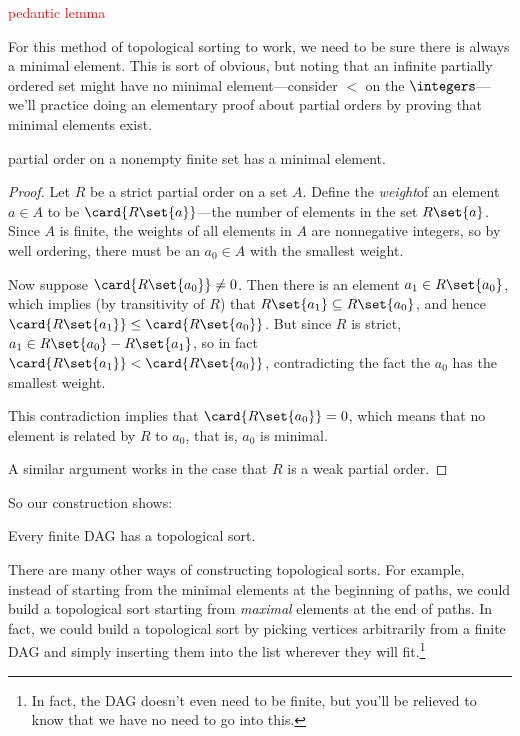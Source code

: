 \begin{editingnotes}
\textcolor{red}{pedantic lemma}

For this method of topological sorting to work, we need to be sure
there is always a minimal element.  This is sort of obvious, but
noting that an infinite partially ordered set might have no minimal
element---consider $<$ on the $\integers$---we'll practice doing an
elementary proof about partial orders by proving that minimal elements
exist.

\begin{lemma}\label{finmin}
   partial order on a nonempty finite set
  has a minimal element.

\begin{proof} Let $R$ be a strict partial order on a set $A$.  Define
 the \emph{weight}of an element $a \in A$ to be
 $\card{R\set{a}}$---the number of elements in the set $R\set{a}$.
 Since $A$ is finite, the weights of all elements in $A$ are
 nonnegative integers, so by well ordering, there must be an $a_0 \in
 A$ with the smallest weight.

Now suppose $\card{R\set{a_0}} \neq 0$.  Then there is an element $a_1 \in
R\set{a_0}$, which implies (by transitivity of $R$) that $R\set{a_1}
\subseteq R\set{a_0}$, and hence $\card{R\set{a_1}} \leq
\card{R\set{a_0}}$.  But since $R$ is strict, $a_1 \in R\set{a_0} -
R\set{a_1}$, so in fact $\card{R\set{a_1}} < \card{R\set{a_0}}$,
contradicting the fact the $a_0$ has the smallest weight.

This contradiction implies that $\card{R\set{a_0}} = 0$, which means that
no element is related by $R$ to $a_0$, that is, $a_0$ is minimal.

A similar argument works in the case that $R$ is a weak partial order.

\end{proof}
\end{lemma}

\end{editingnotes}

So our construction shows:

\begin{theorem}\label{thm:topological}
Every finite DAG has a topological sort.
\end{theorem}

There are many other ways of constructing topological sorts.  For
example, instead of starting from the minimal elements at the
beginning of paths, we could build a topological sort starting from
\emph{maximal} elements at the end of paths.  In fact, we could build
a topological sort by picking vertices arbitrarily from a finite DAG
and simply inserting them into the list wherever they will
fit.\footnote{In fact, the DAG doesn't even need to be finite, but
  you'll be relieved to know that we have no need to go into this.}

